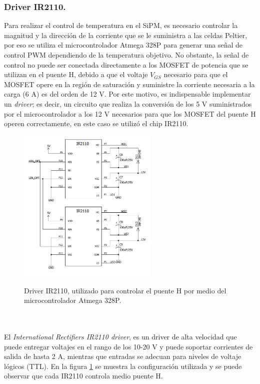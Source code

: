 \subsubsection{Driver IR2110.}
Para realizar el control de temperatura en el SiPM, es necesario controlar la magnitud y la dirección de la corriente que se le suministra a las celdas Peltier, por eso se utiliza  el microcontrolador Atmega 328P para generar una señal de control PWM dependiendo de la temperatura objetivo. No obstante, la señal de control no puede ser conectada directamente a los MOSFET de potencia que se utilizan en el puente H, debido a que el voltaje $V_{GS}$ necesario para que el MOSFET opere en la región de saturación y suministre la corriente necesaria a la carga (6 A) es del orden de 12 V. Por este motivo, es indispensable implementar un \textit{driver}; es decir, un circuito que realiza la conversión de los 5 V suministrados por el microcontrolador a los 12 V necesarios para que los MOSFET del puente H operen correctamente, en este caso se utilizó el chip IR2110.
\begin{figure}[h!]
\begin{centering}
    \caption{Driver IR2110, utilizado para controlar el puente H por medio del microcontrolador Atmega 328P.}
    \includegraphics[width=0.6\textwidth]{Images/Driver.JPG}
    \label{fig:Driver}  
  \par\end{centering}
\end{figure}
\\ \\
El \textit{ International Rectifiers IR2110 driver}, es un driver de alta velocidad que puede entregar voltajes en el rango de los 10-20 V y puede soportar  corrientes de salida de hasta 2 A, mientras que entradas se adecuan para niveles de voltaje lógicos (TTL). En la figura \ref{fig:Driver}  se muestra la configuración utilizada y se puede observar que cada IR2110 controla medio puente H.\\ \\
